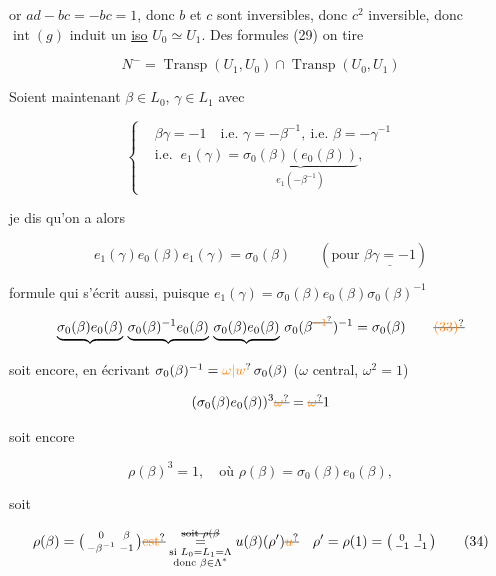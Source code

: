 or $ad-bc=-bc=1$, donc $b$ et $c$ sont inversibles, donc $c^2$ inversible, donc $\operatorname{int}(g)$ induit un \uline{iso} $U_0\simeq U_1$. Des formules (29) on tire


\[
 N^-=\operatorname{Transp}(U_1,U_0)\cap\operatorname{Transp}(U_0,U_1)\tag*{(30)}
\]

Soient maintenant $\beta\in L_0$, $\gamma\in L_1$ avec

\[
\left\{\begin{aligned}
 &\beta\gamma=-1\quad\text{i.e. }\gamma=-\beta^{-1},\ \text{i.e. }\beta=-\gamma^{-1}\\
 &\text{i.e. }\ e_1(\gamma)=\underbrace{\sigma_0(\beta)(e_0(\beta))}_{e_1(-\beta^{-1})},
\end{aligned}\right.\tag*{(31)}
\]

je dis qu'on a alors

\[
 e_1(\gamma)e_0(\beta)e_1(\gamma)=\sigma_0(\beta)\qquad(\text{pour }\underline{\beta\gamma=-1})\tag*{(32)}
\]

formule qui s'écrit aussi, puisque $e_1(\gamma)=\sigma_0(\beta)e_0(\beta)\sigma_0(\beta)^{-1}$

\[
 \underbrace{\sigma_0(\beta)e_0(\beta)}\,\underbrace{\sigma_0(\beta)^{-1}e_0(\beta)}\,\underbrace{\sigma_0(\beta)e_0(\beta)}\,\sigma_0(\beta^{\deleted{\unsure{-1}}})^{-1}=\sigma_0(\beta)
 \tag*{\deleted{\unsure{(33)}}}
\]

soit encore, en écrivant $\sigma_0(\beta)^{-1}=\unsure{\omega|w}\,\sigma_0(\beta)$ ($\omega$ central, $\omega^2=1$)

\[
 (\sigma_0(\beta)e_0(\beta))^3\deleted{\unsure{\omega}}=\deleted{\unsure{\omega}}1
\]

soit encore

\[
 \rho(\beta)^3=1,\quad\text{où }\rho(\beta)=\sigma_0(\beta)e_0(\beta),\tag*{(33)}
\]

soit

\[
 \rho(\beta)=\bigl(\begin{smallmatrix}0&\beta\\-\beta^{-1}&-1\end{smallmatrix}\bigr)\deleted{\unsure{\text{est}}}
 \overset{\deleted{\text{soit }\rho(\beta}}{\underset{\substack{\text{si }L_0=L_1=\Lambda\\\text{donc }\beta\in\Lambda^*}}{=}}
 u(\beta)(\rho')\deleted{\unsure{u}}\quad\rho'=\rho(1)=\bigl(\begin{smallmatrix}0&1\\-1&-1\end{smallmatrix}\bigr)\tag*{(34)}
\]

